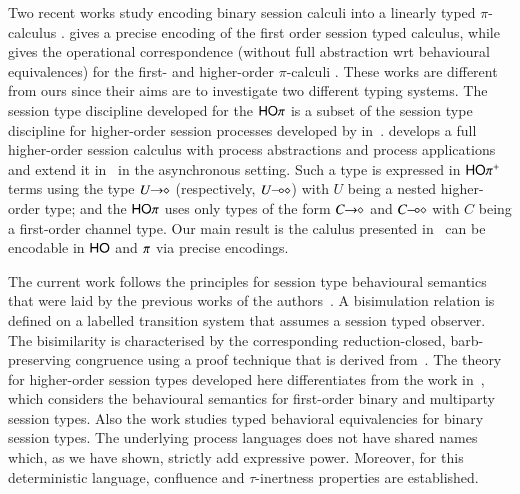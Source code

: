 Two recent works \cite{DemangeonH11,Dardha:2012:STR:2370776.2370794} 
study encoding binary session calculi into 
a linearly typed $\pi$-calculus \cite{BHY}.
\cite{DemangeonH11}
gives a precise encoding of the first order 
session typed calculus, while 
\cite{Dardha:2012:STR:2370776.2370794} 
gives the operational correspondence 
(without full abstraction wrt behavioural equivalences)
for the first- and higher-order 
$\pi$-calculi \cite{tlca07}. 
These works are different from ours since their aims 
are to investigate two different typing systems.  
The session type discipline developed for the $\mathsf{HO}\pi$ is a subset
of the session type discipline
for higher-order session processes developed by 
in~\cite{tlca07,MostrousY15}.
\cite{tlca07} develops a full higher-order session calculus
with process abstractions and process applications and extend it
in~\cite{MostrousY15} in the asynchronous setting.
Such a type is expressed in $\mathsf{HO\pi^{+}}$
terms using the type $U\!\! \rightarrow\!\! \diamond$ (respectively, $U\!\! \multimap\!\! \diamond$)
with $U$ being a nested higher-order type; and 
the $\mathsf{HO}\pi$ uses only types of the form
$C\!\! \rightarrow\!\! \diamond$ and $C\!\! \multimap\!\! \diamond$ with $C$ being a first-order channel type.
Our main result is 
the calulus presented in~\cite{tlca07} can be encodable in 
$\mathsf{HO}$ and $\pi$ via precise encodings. 

The current work follows the principles for
session type behavioural semantics that were laid
by the previous works of the
authors~\cite{dkphdthesis,DBLP:conf/forte/KouzapasYH11,KY13,DBLP:journals/iandc/PerezCPT14}.
A bisimulation relation is defined on a labelled
transition system that assumes a session typed
observer.
The bisimilarity is characterised by the corresponding
reduction-closed, barb-preserving congruence using a
proof technique that is derived from~\cite{Hennessy07}.
The theory for higher-order session types developed here
differentiates from 
the work in~\cite{dkphdthesis,DBLP:conf/forte/KouzapasYH11,KY13}, which 
considers the behavioural semantics for first-order
binary and multiparty session types.
Also the work \cite{DBLP:journals/iandc/PerezCPT14} studies typed behavioral equivalencies for binary session types.
The underlying process languages does not have shared names which, as we have shown, strictly add expressive power. 
Moreover, for this deterministic language, confluence and $\tau$-inertness properties are established.

